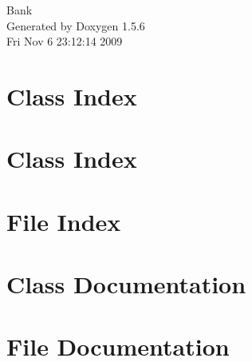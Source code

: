 \documentclass[letterpaper]{book}
\begin{document}
\begin{titlepage}
\vspace*{7cm}
\begin{center}
{\Large Bank }\\
\vspace*{1cm}
{\large Generated by Doxygen 1.5.6}\\
\vspace*{0.5cm}
{\small Fri Nov 6 23:12:14 2009}\\
\end{center}
\end{titlepage}
\clearemptydoublepage
{}
\tableofcontents
\clearemptydoublepage
{}
\chapter{Class Index}

\chapter{Class Index}

\chapter{File Index}

\chapter{Class Documentation}







\chapter{File Documentation}

















\printindex
\end{document}
